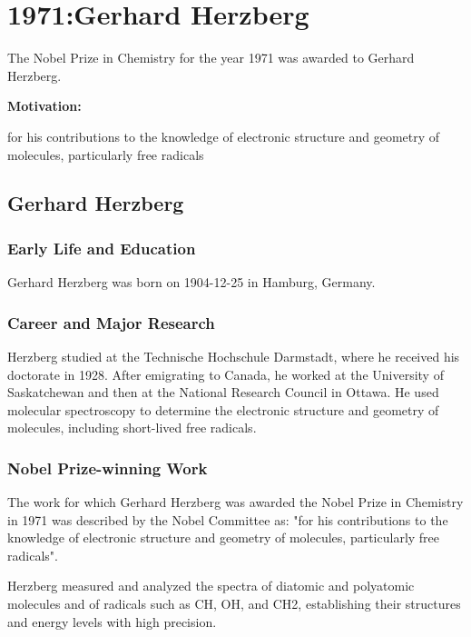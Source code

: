 \chapter{1971:Gerhard Herzberg}

\label{chap:chemistry1971}

The Nobel Prize in Chemistry for the year 1971 was awarded to Gerhard Herzberg.

\textbf{Motivation:}

for his contributions to the knowledge of electronic structure and geometry of molecules, particularly free radicals

\section{Gerhard Herzberg}

\subsection*{Early Life and Education}

Gerhard Herzberg was born on 1904-12-25 in Hamburg, Germany.

\subsection*{Career and Major Research}

Herzberg studied at the Technische Hochschule Darmstadt, where he received his doctorate in 1928. After emigrating to Canada, he worked at the University of Saskatchewan and then at the National Research Council in Ottawa. He used molecular spectroscopy to determine the electronic structure and geometry of molecules, including short-lived free radicals.

\subsection*{Nobel Prize-winning Work}

The work for which Gerhard Herzberg was awarded the Nobel Prize in Chemistry in 1971 was described by the Nobel Committee as: "for his contributions to the knowledge of electronic structure and geometry of molecules, particularly free radicals".

Herzberg measured and analyzed the spectra of diatomic and polyatomic molecules and of radicals such as CH, OH, and CH2, establishing their structures and energy levels with high precision.

